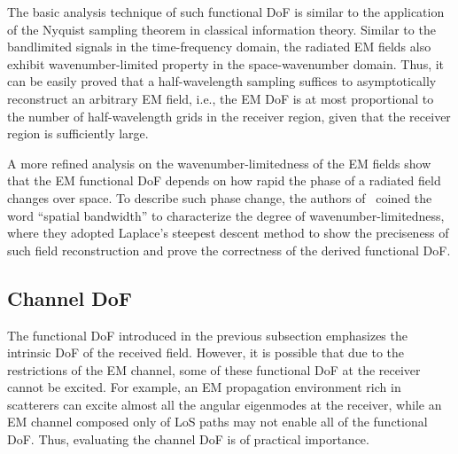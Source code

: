 \documentclass[journal,twocolumn]{IEEEtran}
\begin{document}
The basic analysis technique of such functional DoF is similar to the application of the Nyquist sampling theorem in classical information theory. 
Similar to the bandlimited signals in the time-frequency domain, the radiated EM fields also exhibit wavenumber-limited property in the space-wavenumber domain. 
Thus, it can be easily proved that a half-wavelength sampling suffices to asymptotically reconstruct an arbitrary EM field, i.e., the EM DoF is at most proportional to the number of half-wavelength grids in the receiver region, given that the receiver region is sufficiently large. 

A more refined analysis on the wavenumber-limitedness of the EM fields show that the EM functional DoF depends on how rapid the phase of a radiated field changes over space. 
To describe such phase change, the authors of~\cite{bucci1987spatial} coined the word ``spatial bandwidth'' to characterize the degree of wavenumber-limitedness, where they adopted Laplace's steepest descent method to show the preciseness of such field reconstruction and prove the correctness of the derived functional DoF. 


\subsection{Channel DoF}
The functional DoF introduced in the previous subsection emphasizes the intrinsic DoF of the received field. 
However, it is possible that due to the restrictions of the EM channel, some of these functional DoF at the receiver cannot be excited. For example, an EM propagation environment rich in scatterers can excite almost all the angular eigenmodes at the receiver, while an EM channel composed only of LoS paths may not enable all of the functional DoF. Thus, evaluating the channel DoF is of practical importance.  
\end{document}

